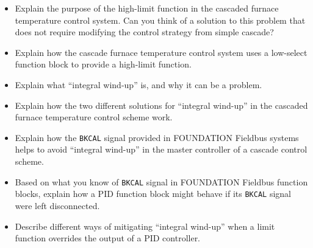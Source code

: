 \begin{itemize}
\item{} Explain the purpose of the high-limit function in the cascaded furnace temperature control system.  Can you think of a solution to this problem that does not require modifying the control strategy from simple cascade?
\item{} Explain how the cascade furnace temperature control system uses a low-select function block to provide a high-limit function.
\item{} Explain what ``integral wind-up'' is, and why it can be a problem.
\item{} Explain how the two different solutions for ``integral wind-up'' in the cascaded furnace temperature control scheme work.
\item{} Explain how the {\tt BKCAL} signal provided in FOUNDATION Fieldbus systems helps to avoid ``integral wind-up'' in the master controller of a cascade control scheme.
\item{} Based on what you know of {\tt BKCAL} signal in FOUNDATION Fieldbus function blocks, explain how a PID function block might behave if its {\tt BKCAL} signal were left disconnected.
\item{} Describe different ways of mitigating ``integral wind-up'' when a limit function overrides the output of a PID controller.
\end{itemize}






